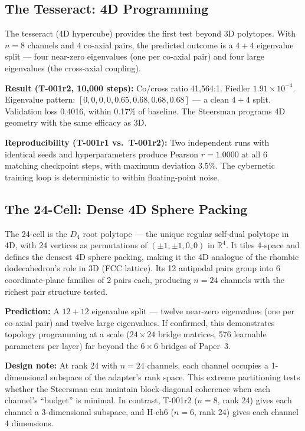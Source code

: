 \subsection{The Tesseract: 4D Programming}
\label{sec:tesseract}

The tesseract (4D hypercube) provides the first test beyond 3D polytopes.
With $n{=}8$ channels and 4 co-axial pairs, the predicted outcome is a
$4{+}4$ eigenvalue split --- four near-zero eigenvalues (one per co-axial
pair) and four large eigenvalues (the cross-axial coupling).

\textbf{Result (T-001r2, 10{,}000 steps):} Co/cross ratio 41{,}564:1.
Fiedler $1.91 \times 10^{-4}$. Eigenvalue pattern:
$[0, 0, 0, 0, 0.65, 0.68, 0.68, 0.68]$ --- a clean $4{+}4$ split.
Validation loss 0.4016, within 0.17\% of baseline. The Steersman programs
4D geometry with the same efficacy as 3D.

\textbf{Reproducibility (T-001r1 vs.\ T-001r2):} Two independent runs with
identical seeds and hyperparameters produce Pearson $r = 1.0000$ at all 6
matching checkpoint steps, with maximum deviation 3.5\%. The cybernetic
training loop is deterministic to within floating-point noise.

\subsection{The 24-Cell: Dense 4D Sphere Packing}
\label{sec:24cell}

The 24-cell is the $D_4$ root polytope --- the unique regular self-dual
polytope in 4D, with 24 vertices as permutations of $(\pm 1, \pm 1, 0, 0)$
in $\mathbb{R}^4$. It tiles 4-space and defines the densest 4D sphere
packing, making it the 4D analogue of the rhombic dodecahedron's role in 3D
(FCC lattice). Its 12 antipodal pairs group into 6 coordinate-plane families
of 2 pairs each, producing $n{=}24$ channels with the richest pair structure
tested.

\textbf{Prediction:} A $12{+}12$ eigenvalue split --- twelve near-zero
eigenvalues (one per co-axial pair) and twelve large eigenvalues. If
confirmed, this demonstrates topology programming at a scale ($24 \times 24$
bridge matrices, 576 learnable parameters per layer) far beyond the $6
\times 6$ bridges of Paper~3.

\textbf{Design note:} At rank 24 with $n{=}24$ channels, each channel
occupies a 1-dimensional subspace of the adapter's rank space. This
extreme partitioning tests whether the Steersman can maintain block-diagonal
coherence when each channel's ``budget'' is minimal. In contrast, T-001r2
($n{=}8$, rank 24) gives each channel a 3-dimensional subspace, and H-ch6
($n{=}6$, rank 24) gives each channel 4 dimensions.

